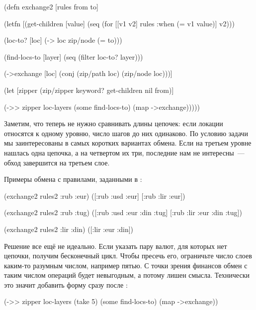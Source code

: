\begin{english}
  \begin{clojure}
(defn exchange2 [rules from to]

  (letfn [(get-children [value]
            (seq (for [[v1 v2] rules
                       :when (= v1 value)]
                   v2)))

          (loc-to? [loc]
            (-> loc zip/node (= to)))

          (find-locs-to [layer]
            (seq (filter loc-to? layer)))

          (->exchange [loc]
            (conj (zip/path loc) (zip/node loc)))]

    (let [zipper (zip/zipper keyword?
                             get-children
                             nil
                             from)]

      (->> zipper
           loc-layers
           (some find-locs-to)
           (map ->exchange)))))
  \end{clojure}
\end{english}

Заметим, что теперь не нужно сравнивать длины цепочек: если локации относятся к
одному уровню, число шагов до них одинаково. По условию задачи мы заинтересованы
в самых коротких вариантах обмена. Если на третьем уровне нашлась одна цепочка,
а на четвертом их три, последние нам не интересны~--- обход завершится на третьем
слое.

Примеры обмена с правилами, заданными в :

\begin{english}
  \begin{clojure}
(exchange2 rules2 :rub :eur)
([:rub :usd :eur] [:rub :lir :eur])

(exchange2 rules2 :rub :tug)
([:rub :usd :eur :din :tug] [:rub :lir :eur :din :tug])

(exchange2 rules2 :lir :din)
([:lir :eur :din])
  \end{clojure}
\end{english}

Решение все ещё не идеально. Если указать пару валют, для которых нет цепочки,
получим бесконечный цикл. Чтобы пресечь его, ограничьте число слоев каким-то
разумным числом, например пятью. С точки зрения финансов обмен с таким числом
операций будет невыгодным, а потому лишен смысла. Технически это значит добавить
форму  сразу после :

\begin{english}
  \begin{clojure}
(->> zipper
     loc-layers
     (take 5)
     (some find-locs-to)
     (map ->exchange))
  \end{clojure}
\end{english}

